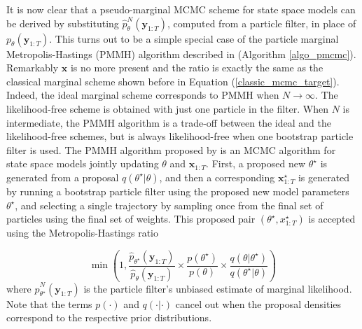 \documentclass[11pt,a4,twosided,singlespacing,titlepagenumber=on]{scrreprt}
\numberwithin{equation}{chapter} %
\theoremstyle{remark}
\newcommand{\matr}[1]{\mathbf{#1}}
\begin{document}
It is now clear that a pseudo-marginal MCMC scheme for state space models can be derived by substituting $\hat{p}^N_{\theta}(\matr{y}_{1:T})$, computed from a particle filter, in place of $p_{\theta}(\matr{y}_{1:T})$. This turns out to be a simple special case of the particle marginal Metropolis-Hastings (PMMH) algorithm described in \cite{andrieu2010} (Algorithm \ref{algo_pmcmc}). Remarkably $\matr{x}$ is no more present and the ratio is exactly the same as the classical marginal scheme shown before in Equation (\ref{classic_mcmc_target}). Indeed, the ideal marginal scheme corresponds to PMMH when $N \rightarrow \infty$. The likelihood-free scheme is obtained with just one particle in the filter. When $N$ is intermediate, the PMMH algorithm is a trade-off between the ideal and the likelihood-free schemes, but is always likelihood-free when one bootstrap particle filter is used. The PMMH algorithm proposed by \cite{andrieu2010} is an MCMC algorithm for state space models jointly updating $\theta$ and $\matr{x}_{1:T}$. First, a proposed new $\theta^\star$ is generated from a proposal $q(\theta^\star|\theta)$, and then a corresponding $\matr{x}_{1:T}^\star$ is generated by running a bootstrap particle filter using the proposed new model parameters $\theta^\star$, and selecting a single trajectory by sampling once from the final set of particles using the final set of weights. This proposed pair $(\theta^\star,x_{1:T}^\star)$ is accepted using the Metropolis-Hastings ratio

\begin{equation}
\min \left(1, \frac{\hat{p}_{\theta^\star}(\matr{y}_{1:T})}{\hat{p}_{\theta}(\matr{y}_{1:T})} \times \frac{p(\theta^\star)}{p(\theta)} \times \frac{q(\theta|\theta^\star)}{q(\theta^\star|\theta)} \right)
\end{equation} 
where $\hat{p}^N_{\theta^\star}(\matr{y}_{1:T})$ is the particle filter's unbiased estimate of marginal likelihood. Note that the terms $p(\cdot)$ and $q(\cdot|\cdot)$ cancel out when the proposal densities correspond to the respective prior distributions.
\end{document}
